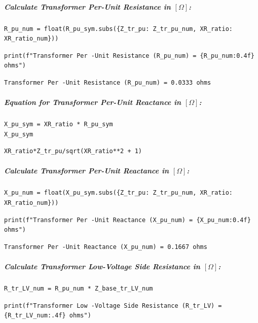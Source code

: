 \subparagraph{Calculate Transformer Per-Unit Resistance in $\left[\Omega\right]$:}

\begin{verbatim}
R_pu_num = float(R_pu_sym.subs({Z_tr_pu: Z_tr_pu_num, XR_ratio: XR_ratio_num}))
\end{verbatim}

\begin{verbatim}
print(f"Transformer Per -Unit Resistance (R_pu_num) = {R_pu_num:0.4f} ohms")
\end{verbatim}

\begin{verbatim}
Transformer Per -Unit Resistance (R_pu_num) = 0.0333 ohms
\end{verbatim}

\subparagraph{Equation for Transformer Per-Unit Reactance in $\left[\Omega\right]$:}

\begin{verbatim}
X_pu_sym = XR_ratio * R_pu_sym
X_pu_sym
\end{verbatim}

\begin{verbatim}
XR_ratio*Z_tr_pu/sqrt(XR_ratio**2 + 1)
\end{verbatim}

\subparagraph{Calculate Transformer Per-Unit Reactance in $\left[\Omega\right]$:}

\begin{verbatim}
X_pu_num = float(X_pu_sym.subs({Z_tr_pu: Z_tr_pu_num, XR_ratio: XR_ratio_num}))
\end{verbatim}

\begin{verbatim}
print(f"Transformer Per -Unit Reactance (X_pu_num) = {X_pu_num:0.4f} ohms")
\end{verbatim}

\begin{verbatim}
Transformer Per -Unit Reactance (X_pu_num) = 0.1667 ohms
\end{verbatim}

\subparagraph{Calculate Transformer Low-Voltage Side Resistance in $\left[\Omega\right]$:}

\begin{verbatim}
R_tr_LV_num = R_pu_num * Z_base_tr_LV_num
\end{verbatim}

\begin{verbatim}
print(f"Transformer Low -Voltage Side Resistance (R_tr_LV) = {R_tr_LV_num:.4f} ohms")
\end{verbatim}

